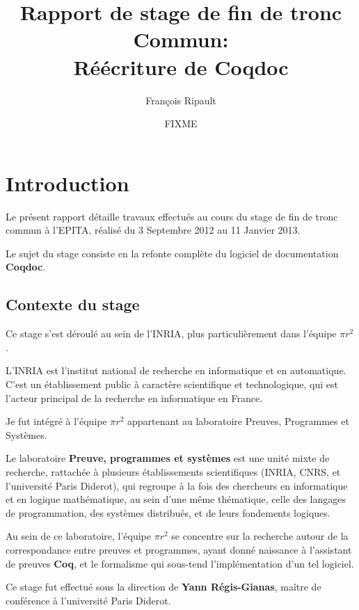 \documentclass[a4paper, 11pt]{report}
\title{Rapport de stage de fin de tronc Commun: \\
  Réécriture de Coqdoc}
\author{François Ripault}
\date{FIXME}
\newcommand{\pir}[0]{\textbf{$\pi r^2$}\xspace}
\newcommand{\coq}[0]{\textbf{Coq}\xspace}
\newcommand{\coqdoc}[0]{\textbf{Coqdoc}\xspace}
\newcommand{\yrg}[0]{\xspace\textbf{Yann Régis-Gianas}\xspace}
\newcommand{\epita}[0]{EPITA}
\begin{document}
\renewcommand{\labelitemi}{$\bullet$}
\renewcommand{\labelitemii}{$\cdot$}
\renewcommand{\labelitemiii}{$\diamond$}
\renewcommand{\labelitemiv}{$\ast$}

\dominitoc
\maketitle
\thispagestyle{empty}

\tableofcontents
\thispagestyle{empty}

\setcounter{page}{0}
\chapter{Introduction}
  Le présent rapport détaille travaux effectués au cours du stage de fin
  de tronc commun à l'\epita, réalisé du 3 Septembre 2012 au 11 Janvier 2013.

  Le sujet du stage consiste en la refonte complète du logiciel de
  documentation \coqdoc.

  \section{Contexte du stage}
  Ce stage s'est déroulé au sein de l'INRIA, plus particulièrement dans
  l'équipe \pir.

  L'INRIA est l'institut national de recherche en informatique et en
  automatique. C'est un établissement public à caractère scientifique et
  technologique, qui est l'acteur principal de la recherche en informatique en
  France.

  Je fut intégré à l'équipe \pir appartenant au laboratoire Preuves, Programmes et
  Systèmes.

  Le laboratoire \textbf{Preuve, programmes et systèmes} est une unité mixte
  de recherche, rattachée à plusieurs établissements scientifiques (INRIA,
  CNRS, et l'université Paris Diderot), qui regroupe à la fois des
  chercheurs en informatique et en logique mathématique, au sein d'une même
  thématique, celle des langages de programmation, des systèmes distribués,
  et de leurs fondements logiques.

  Au sein de ce laboratoire, l'équipe \pir se concentre sur la recherche
  autour de la correspondance entre preuves et programmes, ayant donné
  naissance à l'assistant de preuves \coq, et le formalisme qui sous-tend
  l'implémentation d'un tel logiciel.

  Ce stage fut effectué sous la direction de \yrg, maître de conférence à
  l'université Paris Diderot.
\end{document}
